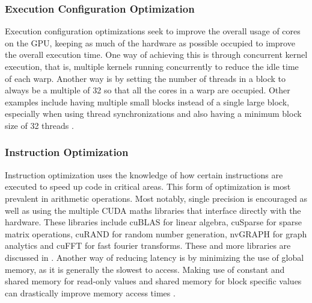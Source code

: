 \subsubsection{Execution Configuration Optimization}
Execution configuration optimizations seek to improve the overall usage of cores on the GPU, keeping as much of the hardware as possible occupied to improve the overall execution time. One way of achieving this is through concurrent kernel execution, that is, multiple kernels running concurrently to reduce the idle time of each warp. Another way is by setting the number of threads in a block to always be a multiple of 32 so that all the cores in a warp are occupied. Other examples include having multiple small blocks instead of a single large block, especially when using thread synchronizations and also having a minimum block size of 32 threads \citep{CUDA}.
%
\subsubsection{Instruction Optimization}
Instruction optimization uses the knowledge of how certain instructions are executed to speed up code in critical areas. This form of optimization is most prevalent in arithmetic operations. Most notably, single precision is encouraged as well as using the multiple CUDA maths libraries that interface directly with the hardware. These libraries include cuBLAS for linear algebra, cuSparse for sparse matrix operations, cuRAND for random number generation, nvGRAPH for graph analytics and cuFFT for fast fourier transforms. These and more libraries are discussed in \citep{CUDA_lib}. Another way of reducing latency is by minimizing the use of global memory, as it is generally the slowest to access. Making use of constant and shared memory for read-only values and shared memory for block specific values can drastically improve memory access times \citep{CUDA}.
